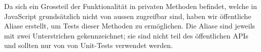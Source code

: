 Da sich ein Grossteil der Funktionalität in privaten Methoden befindet, welche in JavaScript grundsätzlich nicht von aussen zugreifbar sind, haben wir öffentliche Aliase erstellt, um Tests dieser Methoden zu ermöglichen. Die Aliase sind jeweils mit zwei Unterstrichen gekennzeichnet; sie sind nicht teil des öffentlichen \gls{API}s und sollten nur von von Unit-Tests verwendet werden.
